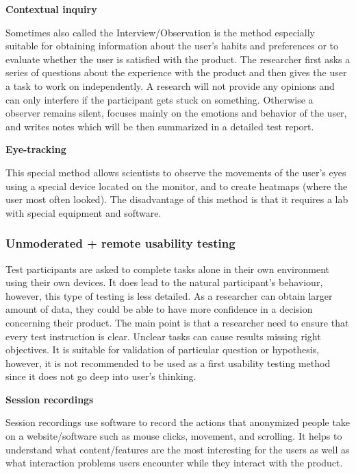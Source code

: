 \documentclass[a4paper,10pt,twoside]{article}
\begin{document}
\noindent \textbf {Contextual inquiry}

\noindent Sometimes also called the Interview/Observation is the method especially suitable for obtaining information about the user's habits and preferences or to evaluate whether the user is satisfied with the product. The researcher first asks a series of questions about the experience with the product and then gives the user a task to work on independently. A research will not provide any opinions and can only interfere if the participant gets stuck on something. Otherwise a observer remains silent,  focuses mainly on the emotions and behavior of the user, and writes notes which will be then summarized in a detailed test report.

\smallskip

\noindent \textbf {Eye-tracking}

\noindent This special method allows scientists to observe the movements of the user's eyes using a special device located on the monitor, and to create heatmaps (where the user most often looked). The disadvantage of this method is that it requires a lab with special equipment and software.

\subsubsection{Unmoderated + remote usability testing}

Test participants are asked to complete tasks alone in their own environment using their own devices. It does lead to the natural participant's behaviour, however, this type of testing is less detailed. As a researcher can obtain larger amount of data, they could be able to have more confidence in a decision concerning their product. The main point is that a researcher need to ensure that every test instruction is clear. Unclear tasks can cause results missing right objectives. It is suitable for validation of particular question or hypothesis, however, it is not recommended to be used as a first usability testing method since it does not go deep into user’s thinking.

\smallskip

\noindent \textbf {Session recordings}

\noindent Session recordings use software to record the actions that anonymized people take on a website/software such as mouse clicks, movement, and scrolling. It helps to understand what content/features are the most interesting for the users as well as what interaction problems users encounter while they interact with the product.
\smallskip
\end{document}
